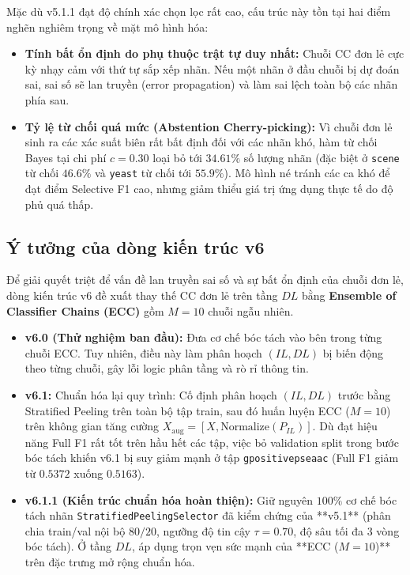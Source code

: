 \documentclass[11pt,a4paper]{article}
\begin{document}
Mặc dù v5.1.1 đạt độ chính xác chọn lọc rất cao, cấu trúc này tồn tại hai điểm nghẽn nghiêm trọng về mặt mô hình hóa:
\begin{itemize}
    \item \textbf{Tính bất ổn định do phụ thuộc trật tự duy nhất:} Chuỗi CC đơn lẻ cực kỳ nhạy cảm với thứ tự sắp xếp nhãn. Nếu một nhãn ở đầu chuỗi bị dự đoán sai, sai số sẽ lan truyền (error propagation) và làm sai lệch toàn bộ các nhãn phía sau.
    \item \textbf{Tỷ lệ từ chối quá mức (Abstention Cherry-picking):} Vì chuỗi đơn lẻ sinh ra các xác suất biên rất bất định đối với các nhãn khó, hàm từ chối Bayes tại chi phí $c = 0.30$ loại bỏ tới $34.61\%$ số lượng nhãn (đặc biệt ở \texttt{scene} từ chối $46.6\%$ và \texttt{yeast} từ chối tới $55.9\%$). Mô hình né tránh các ca khó để đạt điểm Selective F1 cao, nhưng giảm thiểu giá trị ứng dụng thực tế do độ phủ quá thấp.
\end{itemize}

\subsection{Ý tưởng của dòng kiến trúc v6}
Để giải quyết triệt để vấn đề lan truyền sai số và sự bất ổn định của chuỗi đơn lẻ, dòng kiến trúc v6 đề xuất thay thế CC đơn lẻ trên tầng $DL$ bằng \textbf{Ensemble of Classifier Chains (ECC)} gồm $M = 10$ chuỗi ngẫu nhiên.
\begin{itemize}
    \item \textbf{v6.0 (Thử nghiệm ban đầu):} Đưa cơ chế bóc tách vào bên trong từng chuỗi ECC. Tuy nhiên, điều này làm phân hoạch $(IL, DL)$ bị biến động theo từng chuỗi, gây lỗi logic phân tầng và rò rỉ thông tin.
    \item \textbf{v6.1:} Chuẩn hóa lại quy trình: Cố định phân hoạch $(IL, DL)$ trước bằng Stratified Peeling trên toàn bộ tập train, sau đó huấn luyện ECC ($M=10$) trên không gian tăng cường $X_{\text{aug}} = [X, \text{Normalize}(P_{IL})]$. Dù đạt hiệu năng Full F1 rất tốt trên hầu hết các tập, việc bỏ validation split trong bước bóc tách khiến v6.1 bị suy giảm mạnh ở tập \texttt{gpositivepseaac} (Full F1 giảm từ $0.5372$ xuống $0.5163$).
    \item \textbf{v6.1.1 (Kiến trúc chuẩn hóa hoàn thiện):} Giữ nguyên $100\%$ cơ chế bóc tách nhãn \texttt{StratifiedPeelingSelector} đã kiểm chứng của **v5.1** (phân chia train/val nội bộ $80/20$, ngưỡng độ tin cậy $\tau = 0.70$, độ sâu tối đa 3 vòng bóc tách). Ở tầng $DL$, áp dụng trọn vẹn sức mạnh của **ECC ($M=10$)** trên đặc trưng mở rộng chuẩn hóa.
\end{itemize}
\end{document}
